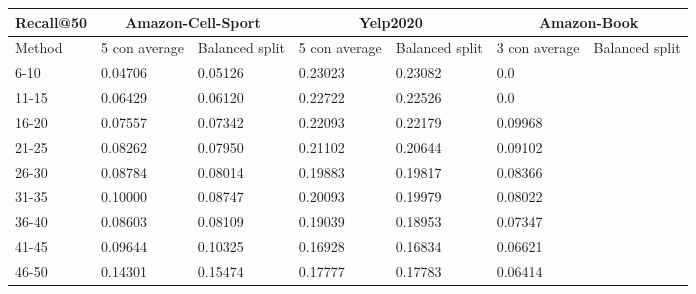 \begin{table*}[h!]
    \centering
    \begin{tabular}{|l|l|l||l|l||l|l|}
        \hline
        Recall@50 & \multicolumn{2}{c||}{Amazon-Cell-Sport} & \multicolumn{2}{c||}{Yelp2020} & \multicolumn{2}{c|}{Amazon-Book}                                                   \\ \hline
        Method    & 5 con average                           & Balanced split                 & 5 con average                    & Balanced split & 3 con average & Balanced split \\ \hline
        6-10      & 0.04706                                 & 0.05126                        & 0.23023                          & 0.23082        & 0.0           &                \\ \hline
        11-15     & 0.06429                                 & 0.06120                        & 0.22722                          & 0.22526        & 0.0           &                \\ \hline
        16-20     & 0.07557                                 & 0.07342                        & 0.22093                          & 0.22179        & 0.09968       &                \\ \hline
        21-25     & 0.08262                                 & 0.07950                        & 0.21102                          & 0.20644        & 0.09102       &                \\ \hline
        26-30     & 0.08784                                 & 0.08014                        & 0.19883                          & 0.19817        & 0.08366       &                \\ \hline
        31-35     & 0.10000                                 & 0.08747                        & 0.20093                          & 0.19979        & 0.08022       &                \\ \hline
        36-40     & 0.08603                                 & 0.08109                        & 0.19039                          & 0.18953        & 0.07347       &                \\ \hline
        41-45     & 0.09644                                 & 0.10325                        & 0.16928                          & 0.16834        & 0.06621       &                \\ \hline
        46-50     & 0.14301                                 & 0.15474                        & 0.17777                          & 0.17783        & 0.06414       &                \\ \hline

\end{tabular}
\end{table*}
